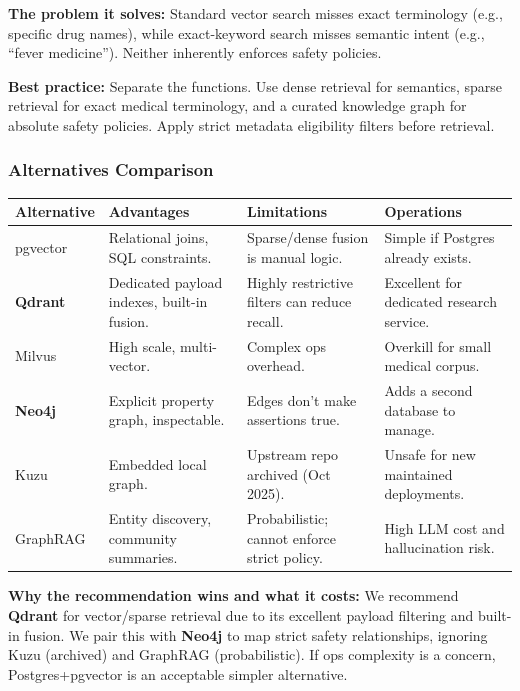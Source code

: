 \documentclass[11pt,a4paper]{article}
\begin{document}
\textbf{The problem it solves:} Standard vector search misses exact terminology (e.g., specific drug names), while exact-keyword search misses semantic intent (e.g., ``fever medicine''). Neither inherently enforces safety policies.

\textbf{Best practice:} Separate the functions. Use dense retrieval for semantics, sparse retrieval for exact medical terminology, and a curated knowledge graph for absolute safety policies. Apply strict metadata eligibility filters before retrieval. 

\subsubsection{Alternatives Comparison}
\begin{table}[ht]
\centering
\begin{tabularx}{\textwidth}{lXXX}
\toprule
\textbf{Alternative} & \textbf{Advantages} & \textbf{Limitations} & \textbf{Operations} \\
\midrule
pgvector & Relational joins, SQL constraints. & Sparse/dense fusion is manual logic. & Simple if Postgres already exists. \\
\textbf{Qdrant} & Dedicated payload indexes, built-in fusion. & Highly restrictive filters can reduce recall. & Excellent for dedicated research service. \\
Milvus & High scale, multi-vector. & Complex ops overhead. & Overkill for small medical corpus. \\
\midrule
\textbf{Neo4j} & Explicit property graph, inspectable. & Edges don't make assertions true. & Adds a second database to manage. \\
Kuzu & Embedded local graph. & Upstream repo archived (Oct 2025). & Unsafe for new maintained deployments. \\
GraphRAG & Entity discovery, community summaries. & Probabilistic; cannot enforce strict policy. & High LLM cost and hallucination risk. \\
\bottomrule
\end{tabularx}
\end{table}

\textbf{Why the recommendation wins and what it costs:} We recommend \textbf{Qdrant} for vector/sparse retrieval due to its excellent payload filtering and built-in fusion. We pair this with \textbf{Neo4j} to map strict safety relationships, ignoring Kuzu (archived) and GraphRAG (probabilistic). If ops complexity is a concern, Postgres+pgvector is an acceptable simpler alternative.
\end{document}
